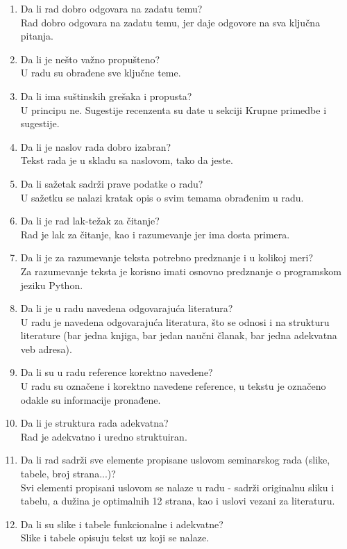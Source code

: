 \documentclass[a4paper]{report}
\begin{document}
\begin{enumerate}
\item Da li rad dobro odgovara na zadatu temu?\\
Rad dobro odgovara na zadatu temu, jer daje odgovore na sva ključna pitanja.
\item Da li je nešto važno propušteno?\\
U radu su obrađene sve ključne teme.
\item Da li ima suštinskih grešaka i propusta?\\
U principu ne. Sugestije recenzenta su date u sekciji Krupne primedbe i sugestije.
\item Da li je naslov rada dobro izabran?\\
Tekst rada je u skladu sa naslovom, tako da jeste.
\item Da li sažetak sadrži prave podatke o radu?\\
U sažetku se nalazi kratak opis o svim temama obrađenim u radu.
\item Da li je rad lak-težak za čitanje?\\
Rad je lak za čitanje, kao i razumevanje jer ima dosta primera.
\item Da li je za razumevanje teksta potrebno predznanje i u kolikoj meri?\\
Za razumevanje teksta je korisno imati osnovno predznanje o programskom jeziku Python.
\item Da li je u radu navedena odgovarajuća literatura?\\
U radu je navedena odgovarajuća literatura, što se odnosi i na strukturu literature (bar jedna knjiga, bar jedan naučni članak, bar jedna adekvatna veb adresa).
\item Da li su u radu reference korektno navedene?\\
U radu su označene i korektno navedene reference, u tekstu je označeno odakle su informacije pronađene.
\item Da li je struktura rada adekvatna?\\
Rad je adekvatno i uredno struktuiran.
\item Da li rad sadrži sve elemente propisane uslovom seminarskog rada (slike, tabele, broj strana...)?\\
Svi elementi propisani uslovom se nalaze u radu - sadrži originalnu sliku i tabelu, a dužina je optimalnih 12 strana, kao i uslovi vezani za literaturu.
\item Da li su slike i tabele funkcionalne i adekvatne?\\
Slike i tabele opisuju tekst uz koji se nalaze.
\end{enumerate}
\end{document}
